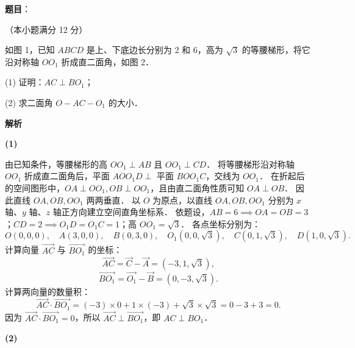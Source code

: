 \begin{answer}

\textbf{题目}：

（本小题满分 12 分）

如图 1，已知 $ABCD$ 是上、下底边长分别为 2 和 6，高为 $\sqrt{3}$ 的等腰梯形，将它沿对称轴 $OO_1$ 折成直二面角，如图 2．
\nopagebreak[4]
\begin{center}\end{center}
\nopagebreak[4]
(1) 证明：$AC \perp BO_1$；

(2) 求二面角 $O - AC - O_1$ 的大小．

\textbf{解析}

\textbf{(1)}

由已知条件，等腰梯形的高 $OO_1 \perp AB$ 且 $OO_1 \perp CD$．
将等腰梯形沿对称轴 $OO_1$ 折成直二面角后，平面 $AOO_1D \perp$ 平面 $BOO_1C$，交线为 $OO_1$．
在折起后的空间图形中，$OA \perp OO_1, OB \perp OO_1$，且由直二面角性质可知 $OA \perp OB$．
因此直线 $OA, OB, OO_1$ 两两垂直．
以 $O$ 为原点，以直线 $OA, OB, OO_1$ 分别为 $x$ 轴、$y$ 轴、$z$ 轴正方向建立空间直角坐标系．
依题设，$AB = 6 \implies OA = OB = 3$；$CD = 2 \implies O_1D = O_1C = 1$；高 $OO_1 = \sqrt{3}$．
各点坐标分别为：
\nopagebreak[4]
\[
O(0, 0, 0), \quad A(3, 0, 0), \quad B(0, 3, 0), \quad O_1(0, 0, \sqrt{3}), \quad C(0, 1, \sqrt{3}), \quad D(1, 0, \sqrt{3}).
\]
计算向量 $\vec{AC}$ 与 $\vec{BO_1}$ 的坐标：
\nopagebreak[4]
\[
\vec{AC} = \vec{C} - \vec{A} = (-3, 1, \sqrt{3}),
\]
\nopagebreak[4]
\[
\vec{BO_1} = \vec{O_1} - \vec{B} = (0, -3, \sqrt{3}).
\]
计算两向量的数量积：
\nopagebreak[4]
\[
\vec{AC} \cdot \vec{BO_1} = (-3) \times 0 + 1 \times (-3) + \sqrt{3} \times \sqrt{3} = 0 - 3 + 3 = 0.
\]
因为 $\vec{AC} \cdot \vec{BO_1} = 0$，所以 $\vec{AC} \perp \vec{BO_1}$，即 $AC \perp BO_1$．

\textbf{(2)}


\end{answer}
